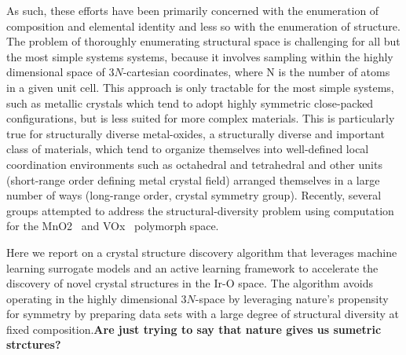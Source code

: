As such, these efforts have been primarily concerned with the enumeration of composition and elemental identity and less so with the enumeration of structure.
%
The problem of thoroughly enumerating structural space is challenging for all but the most simple systems systems, because it involves sampling within the highly dimensional space of $3N$-cartesian coordinates, where N is the number of atoms in a given unit cell.
This approach is only tractable for the most simple systems,
such as metallic crystals which tend to adopt highly symmetric close-packed configurations, but is less suited for more complex materials.
%
This is particularly true for structurally diverse metal-oxides, a structurally diverse and important class of materials, which tend to organize themselves into well-defined local coordination environments such as octahedral and tetrahedral and other units (short-range order defining metal crystal field) arranged themselves in a large number of ways (long-range order, crystal symmetry group). Recently, several groups attempted to address the structural-diversity problem using computation for the MnO2~\cite{} and VOx~\cite{} polymorph space.

%
%
Here we report on a crystal structure discovery  algorithm that leverages machine learning surrogate models and an active learning framework to accelerate the discovery of novel crystal structures in the Ir-O space.
The algorithm avoids operating in the highly dimensional $3N$-space by leveraging nature's propensity for symmetry by preparing data sets with a large degree of structural diversity at fixed composition.{\bf Are just trying to say that nature gives us sumetric strctures? }
%
%


